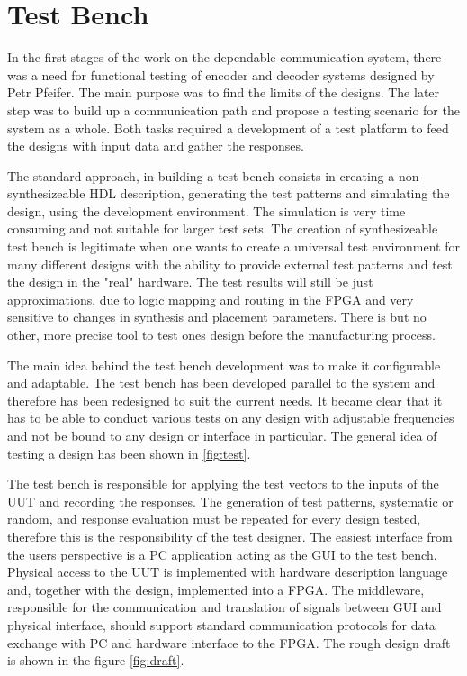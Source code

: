 \chapter{Test Bench}\label{ch:test_bench}
In the first stages of the work on the dependable communication system, there was a need for functional testing of encoder and decoder systems designed by Petr Pfeifer. The main purpose was to find the limits of the designs. The later step was to build up a communication path and propose a testing scenario for the system as a whole. Both tasks required a development of a test platform to feed the designs with input data and gather the responses.

The standard approach, in building a test bench consists in creating a non-synthesizeable HDL description, generating the test patterns and simulating the design, using the development environment. The simulation is very time consuming and not suitable for larger test sets. The creation of synthesizeable test bench is legitimate when one wants to create a universal test environment for many different designs with the ability to provide external test patterns and test the design in the "real" hardware. The test results will still be just approximations, due to logic mapping and routing in the FPGA and very sensitive to changes in synthesis and placement parameters. There is but no other, more precise tool to test ones design before the manufacturing process.

The main idea behind the test bench development was to make it configurable and adaptable. The test bench has been developed parallel to the system and therefore has been redesigned to suit the current needs. It became clear that it has to be able to conduct various tests on any design with adjustable frequencies and not be bound to any design or interface in particular. The general idea of testing a design has been shown in \autoref{fig:test}.

The test bench is responsible for applying the test vectors to the inputs of the UUT and recording the responses. The generation of test patterns, systematic or random, and response evaluation must be repeated for every design tested, therefore this is the responsibility of the test designer. The easiest interface from the users perspective is a PC application acting as the GUI to the test bench. Physical access to the UUT is implemented with hardware description language and, together with the design, implemented into a FPGA. The middleware, responsible for the communication and translation of signals between GUI and physical interface, should support standard communication protocols for data exchange with PC and hardware interface to the FPGA. The rough design draft is shown in the figure \autoref{fig:draft}.\\
 


